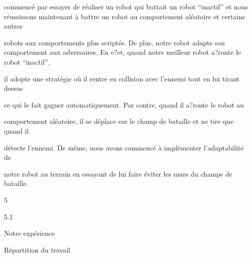 \documentclass[a4paper,portrait,12pt]{article}
\begin{document}
\begin{flushleft}
commenc\'{e} par essayer de r\'{e}aliser un robot qui battait un robot {``}inactif'' et nous r\'{e}ussissons maintenant \`{a} battre un robot au comportement al\'{e}atoire et certains autres
\end{flushleft}


\begin{flushleft}
robots aux comportements plus script\'{e}s. De plus, notre robot adapte son comportement aux adversaires. En e?et, quand notre meilleur robot a?ronte le robot {``}inactif'',
\end{flushleft}


\begin{flushleft}
il adopte une strat\'{e}gie où il rentre en collision avec l'ennemi tout en lui tirant dessus
\end{flushleft}


\begin{flushleft}
ce qui le fait gagner automatiquement. Par contre, quand il a?ronte le robot au
\end{flushleft}


\begin{flushleft}
comportement al\'{e}atoire, il se d\'{e}place sur le champ de bataille et ne tire que quand il
\end{flushleft}


\begin{flushleft}
d\'{e}tecte l'ennemi. De m\^{e}me, nous avons commenc\'{e} \`{a} impl\'{e}menter l'adaptabilit\'{e} de
\end{flushleft}


\begin{flushleft}
notre robot au terrain en essayant de lui faire \'{e}viter les murs du champs de bataille.
\end{flushleft}





5


5.1





\begin{flushleft}
Notre exp\'{e}rience
\end{flushleft}


\begin{flushleft}
R\'{e}partition du travail
\end{flushleft}
\end{document}
